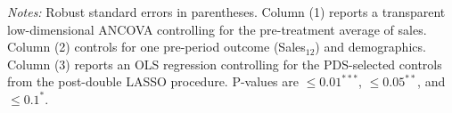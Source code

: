 \documentclass[12pt]{article}
\begin{document}
\begin{table}[H]
\begin{minipage}{0.9\textwidth}
\begin{threeparttable}
\endgroup

\vspace{0.2em}
\begin{tablenotes}[flushleft]
\small
{}
\textit{Notes:} Robust standard errors in parentheses.
Column (1) reports a transparent low-dimensional ANCOVA controlling for the pre-treatment average of sales.
Column (2) controls for one pre-period outcome (Sales$_{12}$) and demographics.
Column (3) reports an OLS regression controlling for the PDS-selected controls from the post-double LASSO procedure. P-values are $\leq 0.01^{***}$,  $\leq 0.05^{**}$, and $\leq 0.1^{*}$.
\end{tablenotes}

\end{threeparttable}
\end{minipage}
\end{table}
\end{document}
